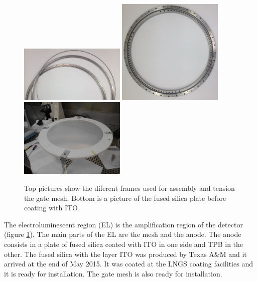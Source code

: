 \begin{figure}[hpt!]
\centering
\includegraphics[width=0.45\textwidth]{FieldCage/img/mesh_grid_1.jpg}
\includegraphics[width=0.45\textwidth]{FieldCage/img/SS_grids_1.jpg}
\includegraphics[width=0.45\textwidth]{FieldCage/img/Anode_coated.jpg}
\caption{Top pictures show the diferent frames used for assembly and tension the gate mesh. Bottom is a picture of the fused silica plate before coating with ITO} \label{fig:el}
\end{figure}

The electroluminescent region (EL) is the amplification region of the detector (figure \ref{fig:el}).  The main parts of the EL are the mesh and the anode. The anode consists in a plate of fused silica coated with ITO in one side and TPB in the other. The fused silica with the layer ITO was produced by Texas A\&M and it arrived at the end of May 2015. It was coated at the LNGS coating facilities and it is ready for installation. The gate mesh is also ready for installation.





